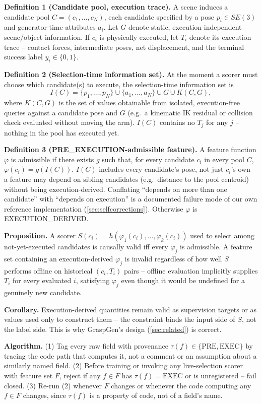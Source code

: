 \documentclass[journal]{IEEEtran}
\begin{document}
\textbf{Definition 1 (Candidate pool, execution trace).} A scene induces a
candidate pool $C = (c_1,\ldots,c_N)$, each candidate specified by a pose
$p_i \in SE(3)$ and generator-time attributes $a_i$. Let $G$ denote
static, execution-independent scene/object information. If $c_i$ is
physically executed, let $T_i$ denote its execution trace -- contact
forces, intermediate poses, net displacement, and the terminal success
label $y_i \in \{0,1\}$.

\textbf{Definition 2 (Selection-time information set).} At the moment a
scorer must choose which candidate(s) to execute, the selection-time
information set is
\[
I(C) = \{p_1,\ldots,p_N\} \cup \{a_1,\ldots,a_N\} \cup G \cup K(C,G),
\]
where $K(C,G)$ is the set of values obtainable from isolated,
execution-free queries against a candidate pose and $G$ (e.g.\ a
kinematic IK residual or collision check evaluated without moving the
arm). $I(C)$ contains no $T_j$ for any $j$ -- nothing in the pool has
executed yet.

\textbf{Definition 3 (PRE\_EXECUTION-admissible feature).} A feature
function $\varphi$ is admissible if there exists $g$ such that, for every
candidate $c_i$ in every pool $C$, $\varphi(c_i) = g(I(C))$. $I(C)$
includes every candidate's pose, not just $c_i$'s own -- a feature may
depend on sibling candidates (e.g.\ distance to the pool centroid) without
being execution-derived. Conflating ``depends on more than one
candidate'' with ``depends on execution'' is a documented failure mode of
our own reference implementation (\cref{sec:selfcorrections}). Otherwise
$\varphi$ is EXECUTION\_DERIVED.

\textbf{Proposition.} A scorer $S(c_i) = h(\varphi_1(c_i),\ldots,\varphi_k(c_i))$
used to select among not-yet-executed candidates is causally valid iff
every $\varphi_j$ is admissible. A feature set containing an
execution-derived $\varphi_j$ is invalid regardless of how well $S$
performs offline on historical $(c_i, T_i)$ pairs -- offline evaluation
implicitly supplies $T_i$ for every evaluated $i$, satisfying $\varphi_j$
even though it would be undefined for a genuinely new candidate.

\textbf{Corollary.} Execution-derived quantities remain valid as
supervision targets or as values used only to construct them -- the
constraint binds the input side of $S$, not the label side. This is why
GraspGen's design (\cref{sec:related}) is correct.

\textbf{Algorithm.} (1) Tag every raw field with provenance
$\tau(f) \in \{\mathrm{PRE}, \mathrm{EXEC}\}$ by tracing the code path
that computes it, not a comment or an assumption about a similarly named
field. (2) Before training or invoking any live-selection scorer with
feature set $F$, reject if any $f \in F$ has $\tau(f)=\mathrm{EXEC}$ or is
unregistered -- fail closed. (3) Re-run (2) whenever $F$ changes or
whenever the code computing any $f \in F$ changes, since $\tau(f)$ is a
property of code, not of a field's name.
\end{document}
